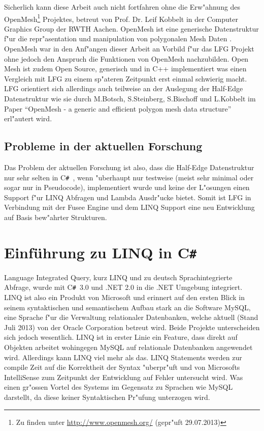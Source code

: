 \documentclass[pagesize, paper=a4, fontsize=12pt,titlepage=true, headings=small, headnosepline, abstractoff, liststotoc, nochapterprefix, plainheadsepline]{scrreprt}
\newcommand{\CS}{C\texttt{\#}}
\newcommand{\CSS}{C\texttt{\# }}
\newcommand{\HES}{Half-Edge Datenstruktur }
\begin{document}
Sicherlich kann diese Arbeit auch nicht fortfahren ohne die Erw"ahnung des OpenMesh\footnote{Zu finden unter \url{http://www.openmesh.org/} (gepr"uft 29.07.2013)} Projektes, betreut von Prof. Dr. Leif Kobbelt in der Computer Graphics Group der RWTH Aachen. OpenMesh ist eine generische Datenstruktur f"ur die repr"asentation und manipulation von polygonalen Mesh Daten \cite{Kobbelt.2013}. OpenMesh war in den Anf"angen dieser Arbeit an Vorbild f"ur das LFG Projekt ohne jedoch den Anspruch die Funktionen von OpenMesh nachzubilden. Open Mesh ist zudem Open Source, generisch und in C++ implementiert was einen Vergleich mit LFG zu einem sp"ateren Zeitpunkt erst einmal schwierig macht. LFG orientiert sich allerdings auch teilweise an der Auslegung der \HES wie sie durch M.Botsch, S.Steinberg, S.Bischoff und L.Kobbelt im Paper "`OpenMesh - a generic and efficient polygon mesh data structure"' \cite{Botsch.2002} erl"autert wird.
		\subsection {Probleme in der aktuellen Forschung}
			Das Problem der aktuellen Forschung ist also, dass die \HES nur sehr selten in \CSS, wenn "uberhaupt nur testweise (meist sehr minimal oder sogar nur in Pseudocode), implementiert wurde und keine der L"osungen einen Support f"ur LINQ Abfragen und Lambda Ausdr"ucke bietet. Somit ist LFG in Verbindung mit der Fusee Engine und dem LINQ Support eine neu Entwicklung auf Basis bew"ahrter Strukturen.
	\section {Einführung zu LINQ in \CS}
		Language Integrated Query, kurz LINQ und zu deutsch Sprachintegrierte Abfrage, wurde mit \CSS 3.0 und .NET 2.0 in die .NET Umgebung integriert. LINQ ist also ein Produkt von Microsoft und erinnert auf den ersten Blick in seinem syntaktischen und semantischem Aufbau stark an die Software MySQL, eine Sprache f"ur die Verwaltung relationaler Datenbanken, welche aktuell (Stand Juli 2013) von der Oracle Corporation betreut wird. Beide Projekte unterscheiden sich jedoch wesentlich. LINQ ist in erster Linie ein Feature, dass direkt auf Objekten arbeitet wohingegen MySQL auf relationale Datenbanken angewendet wird. Allerdings kann LINQ viel mehr als das. LINQ Statements werden zur compile Zeit auf die Korrektheit der Syntax "uberpr"uft und von Microsofts IntelliSense zum Zeitpunkt der Entwicklung auf Fehler untersucht wird. Was einen gr"ossen Vortel des Systems im Gegensatz zu Sprachen wie MySQL darstellt, da diese keiner Syntaktischen Pr"ufung unterzogen wird.
\newline
\end{document}
